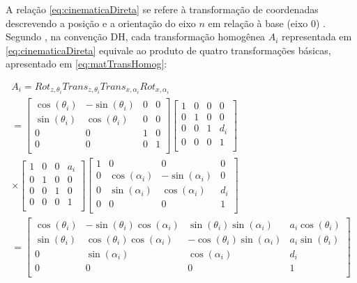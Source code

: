 A relação \eqref{eq:cinematicaDireta} se refere à transformação de coordenadas descrevendo 
a posição e a orientação do eixo $n$ em relação à base (eixo $0$) \cite{siciliano}. Segundo
, na convenção DH, cada transformação homogênea $A_i$ representada em
\eqref{eq:cinematicaDireta} equivale ao produto de quatro transformações básicas, apresentado em 
\eqref{eq:matTransHomog}:

\begin{equation}
  \begin{gathered}
    A_i = Rot_{z,\theta_i}Trans_{z,\theta_i}Trans_{x,\alpha_i}Rot_{x,\alpha_i} \\[0.5cm]
    =\begin{bmatrix}
     \cos(\theta_i) & -\sin(\theta_i) & 0 & 0 \\
     \sin(\theta_i) & \cos(\theta_i) & 0 & 0 \\
     0 & 0 & 1 & 0 \\
     0 & 0 & 0 & 1 \\
    \end{bmatrix}
    \begin{bmatrix}
     1 & 0 & 0 & 0 \\
     0 & 1 & 0 & 0 \\
     0 & 0 & 1 & d_i \\
     0 & 0 & 0 & 1 \\
    \end{bmatrix} \\
    \times \begin{bmatrix}
     1 & 0 & 0 & a_i \\
     0 & 1 & 0 & 0 \\
     0 & 0 & 1 & 0 \\
     0 & 0 & 0 & 1 \\
    \end{bmatrix}
    \begin{bmatrix}
     1 & 0 & 0 & 0 \\
     0 & \cos(\alpha_i) & -\sin(\alpha_i) & 0 \\
     0 & \sin(\alpha_i) & \cos(\alpha_i) & d_i \\
     0 & 0 & 0 & 1 \\
    \end{bmatrix} \\[0.5cm]
    =
    \begin{bmatrix}
     \cos(\theta_i) & -\sin(\theta_i)\cos(\alpha_i) & \sin(\theta_i)\sin(\alpha_i) & a_i\cos(\theta_i) \\
     \sin(\theta_i) & \cos(\theta_i)\cos(\alpha_i) & -\cos(\theta_i)\sin(\alpha_i) & a_i\sin(\theta_i) \\
     0 & \sin(\alpha_i) & \cos(\alpha_i) & d_i \\
     0 & 0 & 0 & 1 \\
    \end{bmatrix}
  \end{gathered}
  \label{eq:matTransHomog}
\end{equation}

